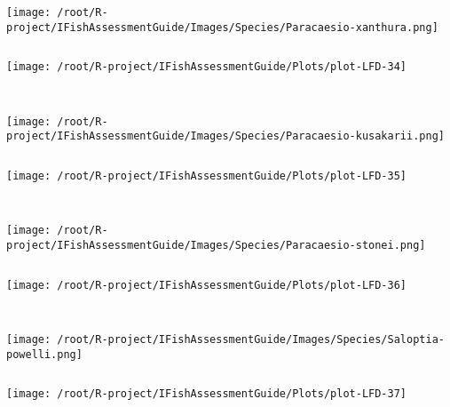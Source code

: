 \begin{knitrout}
\begin{kframe}
\begin{verbatim}
\end{verbatim}
\end{kframe}
\texttt{[image: /root/R-project/IFishAssessmentGuide/Images/Species/Paracaesio-xanthura.png]}
\begin{kframe}\begin{verbatim}
\end{verbatim}
\end{kframe}
\texttt{[image: /root/R-project/IFishAssessmentGuide/Plots/plot-LFD-34]} 
\begin{kframe}\begin{verbatim}
 
\end{verbatim}
\end{kframe}
\texttt{[image: /root/R-project/IFishAssessmentGuide/Images/Species/Paracaesio-kusakarii.png]}
\begin{kframe}\begin{verbatim}
\end{verbatim}
\end{kframe}
\texttt{[image: /root/R-project/IFishAssessmentGuide/Plots/plot-LFD-35]} 
\begin{kframe}\begin{verbatim}
 
\end{verbatim}
\end{kframe}
\texttt{[image: /root/R-project/IFishAssessmentGuide/Images/Species/Paracaesio-stonei.png]}
\begin{kframe}\begin{verbatim}
\end{verbatim}
\end{kframe}
\texttt{[image: /root/R-project/IFishAssessmentGuide/Plots/plot-LFD-36]} 
\begin{kframe}\begin{verbatim}
 
\end{verbatim}
\end{kframe}
\texttt{[image: /root/R-project/IFishAssessmentGuide/Images/Species/Saloptia-powelli.png]}
\begin{kframe}\begin{verbatim}
\end{verbatim}
\end{kframe}
\texttt{[image: /root/R-project/IFishAssessmentGuide/Plots/plot-LFD-37]} 
\begin{kframe}\begin{verbatim}
 

\end{verbatim}
\end{kframe}
\end{knitrout}
